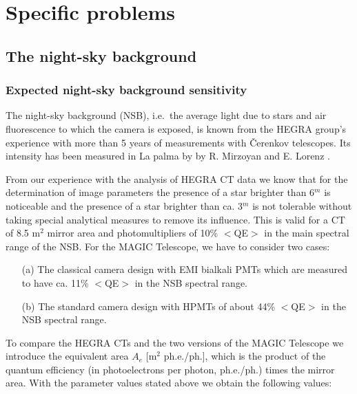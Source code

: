 \setcounter{chapter}{7}

\chapter{Specific problems}

\section{The night-sky background}


\subsection{Expected night-sky background sensitivity}

\medskip The night-sky background (NSB), i.e.\ the average light
due to stars and air fluorescence to which the camera is
exposed,
is known from the HEGRA group's experience with more than 5 years of
measurements with \v{C}erenkov telescopes. Its intensity has been
measured in La palma by 
by R. Mirzoyan and E. Lorenz \cite
{mirzoyan:95}.

From our experience with the analysis of HEGRA CT data we know that for
the determination of image parameters the presence of a star brighter than 6$%
^m$ is noticeable and the presence of a star brighter than ca. 3$^m$ is not
tolerable without taking special analytical measures to remove its
influence. This is valid for a CT of 8.5 m$^2$ mirror area and
photomultipliers of 10\% $<$QE$>$ in the main spectral range of the NSB. For the
MAGIC Telescope, we have to consider two cases:

\begin{itemize}
\item[(a)]  The classical camera design with EMI bialkali 
PMTs which are measured to
have ca. 11\% $<$QE$>$ in the NSB spectral range.

\item[(b)]  The standard camera design with HPMTs of about 44\% $<$QE$>$ in the NSB
spectral range.
\end{itemize}

To compare the HEGRA CTs and the two
versions of the MAGIC Telescope we introduce the equivalent area $A_e 
$ [m$^2$ ph.e./ph.], which is the product of the quantum efficiency (in
photoelectrons per photon, ph.e./ph.) times the mirror area. With the parameter values
stated above we obtain the following values:

